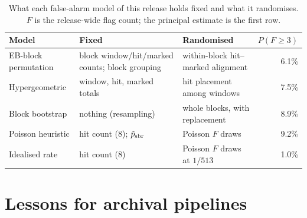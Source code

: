 \documentclass{openjournal}
\begin{document}
\begin{table}
\centering
\small
\caption{What each false-alarm model of this release holds fixed and
what it randomises. $F$ is the release-wide flag count; the principal
estimate is the first row.}
\label{tab:famods}
\begin{tabular}{@{}p{3.4cm}p{2.1cm}p{2.1cm}r@{}}
\hline
Model & Fixed & Randomised & $P(F{\geq}3)$ \\
\hline
EB-block permutation & block window/hit/marked counts; block grouping & within-block hit--marked alignment & 6.1\% \\
Hypergeometric & window, hit, marked totals & hit placement among windows & 7.5\% \\
Block bootstrap & nothing (resampling) & whole blocks, with replacement & 8.9\% \\
Poisson heuristic & hit count (8); $\hat{p}_{\rm sbr}$ & Poisson $F$ draws & 9.2\% \\
Idealised rate & hit count (8) & Poisson $F$ draws at $1/513$ & 1.0\% \\
\hline
\end{tabular}
\end{table}

\section{Lessons for archival pipelines}
\label{app:lessons}
\end{document}
